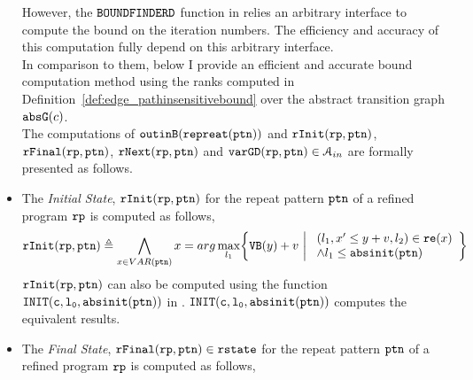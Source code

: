 \begin{itemize}
{%
However, the $\mathtt{BOUNDFINDERD}$ function in \cite{GulwaniJK09} relies an arbitrary interface to
compute the bound on the iteration numbers.
The efficiency and accuracy of this computation fully depend on this arbitrary interface.
\\
In comparison to them, below I provide an efficient and accurate bound computation method using the
ranks computed in Definition~\ref{def:edge_pathinsensitivebound} over the abstract transition graph $\mathtt{abs}{\mathtt{G}}(c)$.
}
\\
The computations of $\mathtt{outinB}(\mathtt{repreat}({\mathtt{ptn}}))$ and $\mathtt{rInit}(\mathtt{rp}, \mathtt{ptn})$,
$\mathtt{rFinal}(\mathtt{rp}, \mathtt{ptn})$, $\mathtt{rNext}(\mathtt{rp}, \mathtt{ptn})$ and $\mathtt{varGD}(\mathtt{rp}, \mathtt{ptn}) \in \mathcal{A}_{in}$
are formally presented as follows.
\item The \emph{Initial State}, $\mathtt{rInit}(\mathtt{rp}, \mathtt{ptn})$ for the repeat pattern $\mathtt{ptn}$ of a refined program $\mathtt{rp}$ is computed as follows,
\[
  \rfinit(\rprog, \rpattern) \triangleq 
  \bigwedge_{x \in VAR(\rpattern)}
  x
  = arg\max_{l_1}\left\{
    \varinvar(y) + v ~\middle\vert~ 
    \begin{array}{l} 
      (l_1, x' \leq y + v, l_2) \in \reset(x) 
      \\
    \land l_1 \leq \absinit(\rpattern)
  \end{array}
  \right\}
  \]
$\mathtt{rInit}(\mathtt{rp}, \mathtt{ptn})$ can also be computed using the function $\mathtt{INIT(c, l_0, \mathtt{abs}{\mathtt{init}}(\mathtt{ptn}))}$ in \cite{GulwaniJK09}. 
$\mathtt{INIT(c, l_0, \mathtt{abs}{\mathtt{init}}(\mathtt{ptn}))}$ computes the equivalent results.
%
\item  The {\emph{Final State}, $\mathtt{rFinal}(\mathtt{rp}, \mathtt{ptn}) \in \mathtt{rstate}$ for the repeat pattern $\mathtt{ptn}$ of a refined program $\mathtt{rp}$ is computed as follows, }

\end{itemize}
